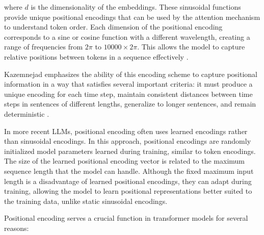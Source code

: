 where \( d \) is the dimensionality of the embeddings. These sinusoidal functions provide unique positional encodings that can be used by the attention mechanism to understand token order. Each dimension of the positional encoding corresponds to a sine or cosine function with a different wavelength, creating a range of frequencies from \( 2\pi \) to \( 10000 \times 2\pi \). This allows the model to capture relative positions between tokens in a sequence effectively \cite{vaswani2017attention}.

Kazemnejad emphasizes the ability of this encoding scheme to capture positional information in a way that satisfies several important criteria: it must produce a unique encoding for each time step, maintain consistent distances between time steps in sentences of different lengths, generalize to longer sentences, and remain deterministic \cite{kazemnejad2019:pencoding}.

In more recent LLMs, positional encoding often uses learned encodings rather than sinusoidal encodings. In this approach, positional encodings are randomly initialized model parameters learned during training, similar to token encodings. The size of the learned positional encoding vector is related to the maximum sequence length that the model can handle. Although the fixed maximum input length is a disadvantage of learned positional encodings, they can adapt during training, allowing the model to learn positional representations better suited to the training data, unlike static sinusoidal encodings.

Positional encoding serves a crucial function in transformer models for several reasons:

